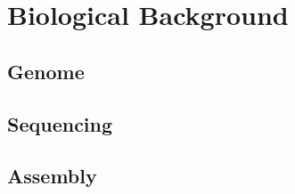 \section{Biological Background}\label{SECTION:BIOINTRO}

\subsection{Genome}

\subsection{Sequencing}

\subsection{Assembly}


